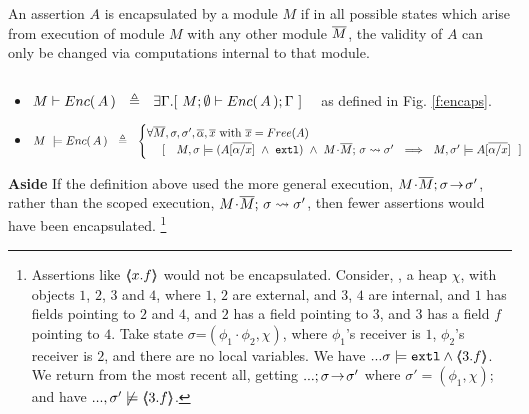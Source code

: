 
{An assertion $A$  is  encapsulated by a module $M$  if in all possible states which arise from execution of module $M$ with any other  module $\overline{M}$, the validity of $A$}  {can only be changed via computations internal to that module}.
 

\begin{definition} $~$ \\
\label{d:encaps}
\begin{itemize}
\item 
$M \vdash {\ensuremath Enc(\, A\, )}  \ \   \triangleq  \ \  \exists \Gamma.[\ M; \emptyset \vdash {\ensuremath Enc(\, A\, )}; \Gamma\ ]$ \ \  as defined in Fig. \ref{f:encaps}.
\item
$ %
    M\ \models \encaps{A}\ \   \triangleq  \ \   
    \begin{cases}
     \forall \Mtwo, \sigma, \sigma',  \overline{\alpha}, \overline{x} \mbox{ with } \overline{x}=Free(A)\\ %
   \ \ \ \  [\ \ \  \satisfiesA{M}{\sigma}{({A[{\overline {\alpha/x}}]} \ \wedge\ \externalexec)}\  \wedge\ { \leadstoBounded {M\madd\Mtwo}  {\sigma}{\sigma'}} %
   \ \ \Longrightarrow\ \ 
   {M},{\sigma'}\models{A[{\overline {\alpha/x}}]} \ \  ]
    \end{cases}
 $%
 \end{itemize}
  \end{definition}

\noindent
\textbf{Aside} {If the definition above used the more general execution, $M\!\cdot\!\overline{M};\sigma\! \rightarrow\! {\sigma'}$, rather than the scoped execution,  $M\!\cdot\!\overline{M};\, {\sigma} \rightsquigarrow \sigma'$, then fewer assertions would have been encapsulated.}
\footnote{{Assertions like    $\langle\!\!\langle x.f \rangle\!\!\rangle$ would not be encapsulated.
Consider, \eg, a heap $\chi$, with objects $1$, $2$, $3$ and $4$, where  $1$, $2$ are external, and $3$, $4$ are internal, and  $1$ has fields pointing to $2$ and $4$, and $2$ has a field pointing to $3$, and $3$ has a field $f$ pointing to $4$. Take  state $\sigma$=$(\phi_1\!\cdot\!\phi_2,\chi)$, where $\phi_1$'s receiver is $1$,  $\phi_2$'s receiver is $2$,   and there are no local variables. 
We have  $...\sigma\models \mbox{\normalfont{\texttt{extl}}} \wedge \langle\!\!\langle 3.f \rangle\!\!\rangle$. 
We  return from the most recent all, 
getting  $...;\sigma\! \rightarrow\! {\sigma'}$ where $\sigma'=(\phi_1,\chi)$; and have   $...,\sigma'\not\models  \langle\!\!\langle 3.f \rangle\!\!\rangle$.
}}

